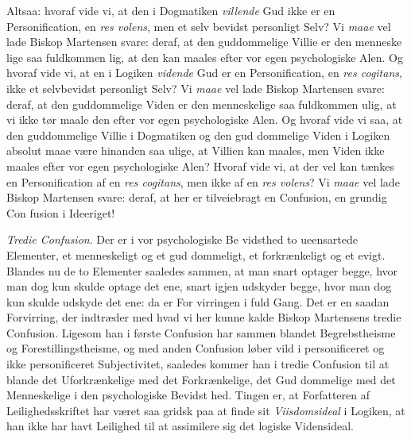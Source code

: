 \documentclass[12pt]{book}
\newcommand{\opage}[1]{\marginnote{\footnotesize\textit{[#1]}}}
\begin{document}
Altsaa: hvoraf vide vi, at den i Dogmatiken \emph{villende}
Gud ikke er en Personification, en \textit{res volens}, men et selv\-%
bevidst personligt Selv? Vi \emph{maae} vel lade Biskop Martensen
svare: deraf, at den guddommelige Villie er den menneske\-%
lige saa fuldkommen lig, at den kan maales efter vor egen
\opage{124}\setcounter{footnote}{0}%
psychologiske Alen. Og hvoraf vide vi, at en i Logiken
\emph{vidende} Gud er en Personification, en \textit{res cogitans}, ikke
et selvbevidst personligt Selv? Vi \emph{maae} vel lade Biskop
Martensen svare: deraf, at den guddommelige Viden er
den menneskelige saa fuldkommen ulig, at vi ikke tør maale
den efter vor egen psychologiske Alen. Og hvoraf vide vi
saa, at den guddommelige Villie i Dogmatiken og den gud\-%
dommelige Viden i Logiken absolut maae være hinanden saa
ulige, at Villien kan maales, men Viden ikke maales efter
vor egen psychologiske Alen? Hvoraf vide vi, at der vel kan
tænkes en Personification af en \textit{res cogitans}, men ikke af
en \textit{res volens}? Vi \emph{maae} vel lade Biskop Martensen svare:
deraf, at her er tilveiebragt en Confusion, en grundig Con\-%
fusion i Ideeriget!

\emph{Tredie Confusion}. Der er i vor psychologiske Be\-%
vidsthed to ueensartede Elementer, et menneskeligt og et gud\-%
dommeligt, et forkrænkeligt og et evigt. Blandes nu de to
Elementer saaledes sammen, at man snart optager begge,
hvor man dog kun skulde optage det ene, snart igjen udskyder
begge, hvor man dog kun skulde udskyde det ene: da er For\-%
virringen i fuld Gang. Det er en saadan Forvirring, der
indtræder med hvad vi her kunne kalde Biskop Martensens
tredie Confusion. Ligesom han i første Confusion har sammen\-%
blandet Begrebstheisme og Forestillingstheisme, og med anden
Confusion løber vild i personificeret og ikke personificeret
Subjectivitet, saaledes kommer han i tredie Confusion til at
blande det Uforkrænkelige med det Forkrænkelige, det Gud\-%
dommelige med det Menneskelige i den psychologiske Bevidst\-%
hed. Tingen er, at Forfatteren af Leilighedsskriftet har været
saa gridsk paa at finde sit \emph{Viisdomsideal} i Logiken, at
han ikke har havt Leilighed til at assimilere sig det logiske
Vidensideal.
\end{document}
